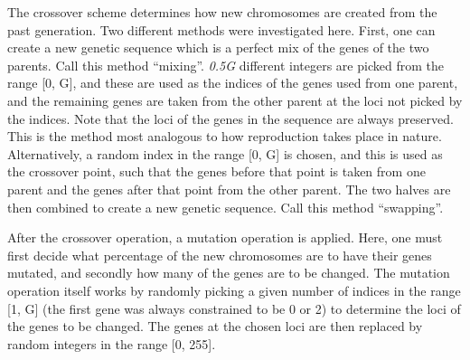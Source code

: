 \documentclass[multicolumn, 9pt]{extarticle}
\begin{document}
The crossover scheme determines how new chromosomes are created from the past generation. Two different methods were investigated here. First, one can create a new genetic sequence which is a perfect mix of the genes of the two parents. Call this method ``mixing''. \textit{0.5G} different integers are picked from the range [0, G], and these are used as the indices of the genes used from one parent, and the remaining genes are taken from the other parent at the loci not picked by the indices. Note that the loci of the genes in the sequence are always preserved. This is the method most analogous to how reproduction takes place in nature. Alternatively, a random index in the range [0, G] is chosen, and this is used as the crossover point, such that the genes before that point is taken from one parent and the genes after that point from the other parent. The two halves are then combined to create a new genetic sequence. Call this method ``swapping''. 

After the crossover operation, a mutation operation is applied. Here, one must first decide what percentage of the new chromosomes are to have their genes mutated, and secondly how many of the genes are to be changed. The mutation operation itself works by randomly picking a given number of indices in the range [1, G] (the first gene was always constrained to be 0 or 2) to determine the loci of the genes to be changed. The genes at the chosen loci are then replaced by random integers in the range [0, 255].
\end{document}

